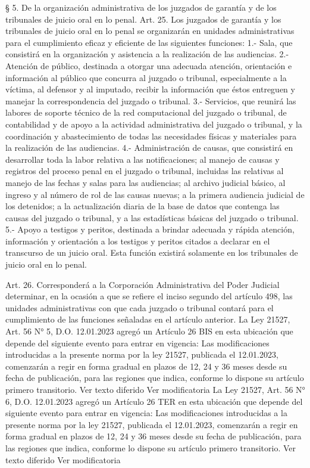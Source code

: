     § 5. De la organización administrativa de los juzgados de garantía y de los tribunales de juicio oral en lo penal.
    Art. 25. Los juzgados de garantía y los tribunales de juicio oral en lo penal se organizarán en unidades administrativas para el cumplimiento eficaz y eficiente de las siguientes funciones:
    1.- Sala, que consistirá en la organización y asistencia a la realización de las audiencias.
    2.- Atención de público, destinada a otorgar una adecuada atención, orientación e información al público que concurra al juzgado o tribunal, especialmente a la víctima, al defensor y al imputado, recibir la información que éstos entreguen y manejar la correspondencia del juzgado o tribunal.
    3.- Servicios, que reunirá las labores de soporte técnico de la red computacional del juzgado o tribunal, de contabilidad y de apoyo a la actividad administrativa del juzgado o tribunal, y la coordinación y abastecimiento de todas las necesidades físicas y materiales para la realización de las audiencias.
    4.- Administración de causas, que consistirá en desarrollar toda la labor relativa a las notificaciones; al manejo de causas y registros del proceso penal en el juzgado o tribunal, incluidas las relativas al manejo de las fechas y salas para las audiencias; al archivo judicial básico, al ingreso y al número de rol de las causas nuevas; a la primera audiencia judicial de los detenidos; a la actualización diaria de la base de datos que contenga las causas del juzgado o tribunal, y a las estadísticas básicas del juzgado o tribunal.
    5.- Apoyo a testigos y peritos, destinada a brindar adecuada y rápida atención, información y orientación a los testigos y peritos citados a declarar en el transcurso de un juicio oral. Esta función existirá solamente en los tribunales de juicio oral en lo penal.


    Art. 26. Corresponderá a la Corporación Administrativa del Poder Judicial determinar, en la ocasión a que se refiere el inciso segundo del artículo 498, las unidades administrativas con que cada juzgado o tribunal contará para el cumplimiento de las funciones señaladas en el artículo anterior.
 La Ley 21527, Art. 56 N° 5, D.O. 12.01.2023 agregó un Artículo 26 BIS en esta ubicación que depende del siguiente evento para entrar en vigencia: Las modificaciones introducidas a la presente norma por la ley 21527, publicada el 12.01.2023, comenzarán a regir en forma gradual en plazos de 12, 24 y 36 meses desde su fecha de publicación, para las regiones que indica, conforme lo dispone su artículo primero transitorio.
Ver texto diferido
Ver modificatoria
 La Ley 21527, Art. 56 N° 6, D.O. 12.01.2023 agregó un Artículo 26 TER en esta ubicación que depende del siguiente evento para entrar en vigencia: Las modificaciones introducidas a la presente norma por la ley 21527, publicada el 12.01.2023, comenzarán a regir en forma gradual en plazos de 12, 24 y 36 meses desde su fecha de publicación, para las regiones que indica, conforme lo dispone su artículo primero transitorio.
Ver texto diferido
Ver modificatoria

